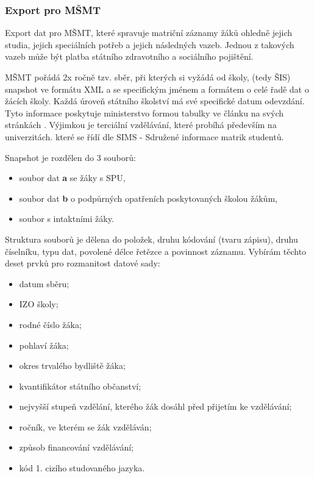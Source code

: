 \documentclass[FM,Proj]{tulthesis}
\begin{document}
\subsubsection{Export pro MŠMT}\label{section:export-pro-msmt}
Export dat pro MŠMT, které spravuje matriční 
záznamy žáků ohledně jejich studia, jejich speciálních potřeb a jejich následných vazeb.
Jednou z takových vazeb může být platba státního zdravotního a sociálního pojištění.

MŠMT pořádá 2x ročně tzv. sběr\cite{skolni-matrika}, při kterých si vyžádá od školy,
(tedy ŠIS) snapshot ve formátu XML a se specifickým jménem a formátem o celé řadě 
dat o žácích školy. Každá úroveň státního školství má své specifické datum odevzdání.
Tyto informace poskytuje ministerstvo formou tabulky ve článku na svých stránkách
\cite{msmt-terminy-predavani-dat-2023}. Výjimkou je terciální vzdělávání, které probíhá
především na univerzitách. které se řídí dle SIMS - Sdružené informace matrik studentů.

Snapshot je rozdělen do 3 souborů:
\begin{itemize}
    \item soubor dat \textbf{a} se žáky s SPU,
    \item soubor dat \textbf{b} o podpůrných opatřeních poskytovaných školou žákům,
    \item soubor s intaktními žáky.
\end{itemize}

Struktura souborů je dělena do položek, druhu kódování (tvaru zápisu),
druhu číselníku, typu dat, povolené délce řetězce a povinnost záznamu.
Vybírám těchto deset prvků pro rozmanitost datové sady:
\begin{itemize}
    \item datum sběru;
    \item IZO školy;
    \item rodné číslo žáka;
    \item pohlaví žáka;
    \item okres trvalého bydliště žáka;
    \item kvantifikátor státního občanství;
    \item nejvyšší stupeň vzdělání, kterého žák dosáhl před přijetím ke vzdělávání;
    \item ročník, ve kterém se žák vzděláván;
    \item způsob financování vzdělávání;
    \item kód 1. cizího studovaného jazyka.
\end{itemize}
\end{document}
